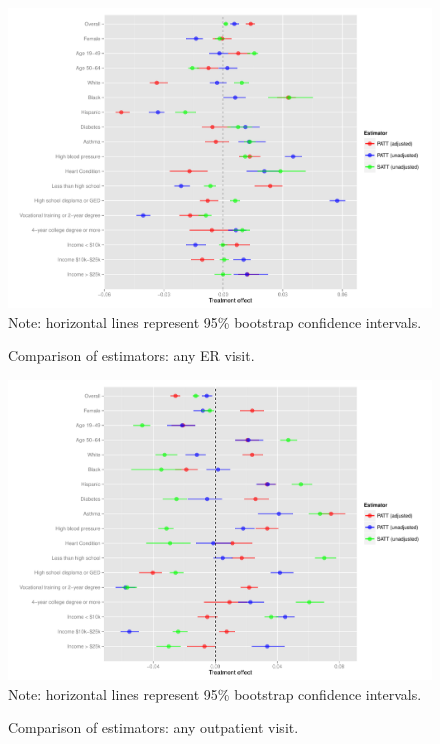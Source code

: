 \documentclass[12pt]{article}
\begin{document}
\begin{figure}[h]
\begin{center}
    \caption{Comparison of estimators: any ER visit.}
\includegraphics[width = 1.1\textwidth]{any-visit-plot.pdf}
\footnotesize{Note: horizontal lines represent 95\% bootstrap confidence intervals.}
\label{fig:any-visit-plot}
\end{center}
\end{figure}

\begin{figure}[h]
\begin{center}
    \caption{Comparison of estimators: any outpatient visit.}
\includegraphics[width = 1.1\textwidth]{any-out-plot.pdf}
\footnotesize{Note: horizontal lines represent 95\% bootstrap confidence intervals.}
\label{fig:any-out-plot}
\end{center}
\end{figure}
\end{document}
